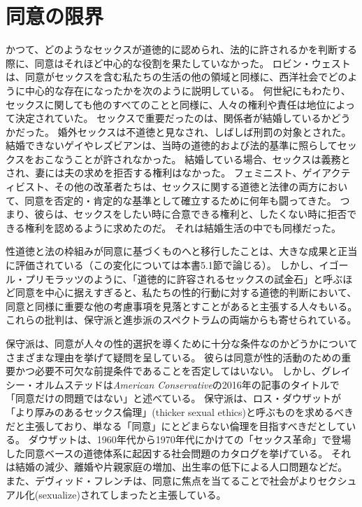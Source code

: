 \documentclass[paper=a4,book,openany]{jlreq} \usepackage{mystyle}
\begin{document}
\section{同意の限界}

かつて、どのようなセックスが道徳的に認められ、法的に許されるかを判断する際に、同意はそれほど中心的な役割を果たしていなかった。
ロビン・ウェストは、同意がセックスを含む私たちの生活の他の領域と同様に、西洋社会でどのように中心的な存在になったかを次のように説明している。
何世紀にもわたり、セックスに関しても他のすべてのことと同様に、人々の権利や責任は地位によって決定されていた。
セックスで重要だったのは、関係者が結婚しているかどうかだった。
婚外セックスは不道徳と見なされ、しばしば刑罰の対象とされた。
結婚できないゲイやレズビアンは、当時の道徳的および法的基準に照らしてセックスをおこなうことが許されなかった。
結婚している場合、セックスは義務とされ、妻には夫の求めを拒否する権利はなかった。
フェミニスト、ゲイアクティビスト、その他の改革者たちは、セックスに関する道徳と法律の両方において、同意を否定的・肯定的な基準として確立するために何年も闘ってきた。
つまり、彼らは、セックスをしたい時に合意できる権利と、したくない時に拒否できる権利を認めるように求めたのだ。
それは結婚生活の中でも同様だった\citep[p.7]{west20:_consen_legit_dysph}。

性道徳と法の枠組みが同意に基づくものへと移行したことは、大きな成果と正当に評価されている（この変化については本書5.1節で論じる）。
しかし、イゴール・プリモラッツのように、「道徳的に許容されるセックスの試金石」と呼ぶほど同意を中心に据えすぎると、私たちの性的行動に対する道徳的判断において、同意と同様に重要な他の考慮事項を見落とすことがあると主張する人々もいる\citep{primoratz01:_sexual_moral}。
これらの批判は、保守派と進歩派のスペクトラムの両端からも寄せられている。

保守派は、同意が人々の性的選択を導くために十分な条件なのかどうかについてさまざまな理由を挙げて疑問を呈している。
彼らは同意が性的活動のための重要かつ必要不可欠な前提条件であることを否定してはいない。
しかし、グレイシー・オルムステッドは\emph{American Conservative}の2016年の記事のタイトルで「同意だけの問題ではない」と述べている\citep{olmstead16:_its_not_just_consen}。
保守派は、ロス・ダウザットが「より厚みのあるセックス倫理」(thicker sexual ethics)と呼ぶものを求めるべきだと主張しており、単なる「同意」にとどまらない倫理を目指すべきだとしている\citep{douthat17:_age_consen_its_discon}。
ダウザットは、1960年代から1970年代にかけての「セックス革命」で登場した同意ベースの道徳体系に起因する社会問題のカタログを挙げている。
それは結婚の減少、離婚や片親家庭の増加、出生率の低下による人口問題などだ。
また、デヴィッド・フレンチは、同意に焦点を当てることで社会がよりセクシュアル化(sexualize)されてしまったと主張している。
\end{document}
